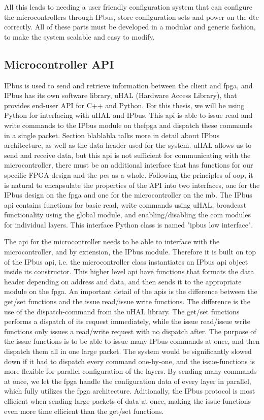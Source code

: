 \documentclass[main.tex]{subfiles}
\begin{document}
All this leads to needing a user friendly configuration system that can configure the microcontrollers through IPbus, store configuration sets and power on the \gls{dtc} correctly. All of these parts must be developed in a modular and generic fashion, to make the system scalable and easy to modify.

\subsection{Microcontroller API}

IPbus is used to send and retrieve information between the client and \gls{fpga}, and IPbus has its own software library, uHAL (Hardware Access Library), that provides end-user API for C++ and Python. For this thesis, we will be using Python for interfacing with uHAL and IPbus. This \gls{api} is able to issue read and write commands to the IPbus module on the\gls{fpga} and dispatch these commands in a single packet. Section blablabla talks more in detail about IPbus architecture, as well as the data header used for the system. uHAL allows us to send and receive data, but this \gls{api} is not sufficient for communicating with the microcontroller, there must be an additional interface that has functions for our specific FPGA-design and the \gls{pcs} as a whole. Following the principles of \gls{oop}, it is natural to encapsulate the properties of the API into two interfaces, one for the IPbus design on the \gls{fpga} and one for the microcontroller on the \gls{mb}. The IPbus \gls{api} contains functions for basic read, write commands using uHAL, broadcast functionality using the global module, and enabling/disabling the com modules for individual layers. This interface Python class is named "ipbus low interface".

The \gls{api} for the microcontroller needs to be able to interface with the microcontroller, and by extension, the IPbus module. Therefore it is built on top of the IPbus \gls{api}, i.e. the microcontroller class instantiates an IPbus \gls{api} object inside its constructor. This higher level \gls{api} have functions that formats the data header depending on address and data, and then sends it to the appropriate module on the \gls{fpga}. An important detail of the \gls{api}s is the difference between the get/set functions and the issue read/issue write functions. The difference is the use of the dispatch-command from the uHAL library. The get/set functions performs a dispatch of its request immediately, while the issue read/issue write functions only issues a read/write request with no dispatch after. The purpose of the issue functions is to be able to issue many IPbus commands at once, and then dispatch them all in one large packet. The system would be significantly slowed down if it had to dispatch every command one-by-one, and the issue-functions is more flexible for parallel configuration of the layers. By sending many commands at once, we let the \gls{fpga} handle the configuration data of every layer in parallel, which fully utilizes the \gls{fpga} architecture. Aditionally, the IPbus protocol is most efficient when sending large packets of data at once, making the issue-functions even more time efficient than the get/set functions.
\end{document}
